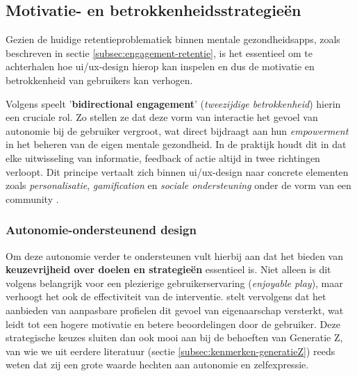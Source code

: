 \subsection{Motivatie- en betrokkenheidsstrategieën}
\label{subsec:motivatie-betrokkenheid-strat}

\vspace{1em}

Gezien de huidige retentieproblematiek binnen mentale gezondheidsapps, zoals beschreven in sectie \ref{subsec:engagement-retentie}, is het essentieel om te achterhalen hoe \acrshort{ui}/\acrshort{ux}-design hierop kan inspelen en dus de motivatie en betrokkenheid van gebruikers kan verhogen.

\vspace{1em}

Volgens \textcite{Portz2024} speelt '\textbf{bidirectional engagement}' (\textit{tweezijdige betrokkenheid}) hierin een cruciale rol. Zo stellen ze dat deze vorm van interactie het gevoel van autonomie bij de gebruiker vergroot, wat direct bijdraagt aan hun \textit{empowerment} in het beheren van de eigen mentale gezondheid. In de praktijk houdt dit in dat elke uitwisseling van informatie, feedback of actie altijd in twee richtingen verloopt. Dit principe vertaalt zich binnen \acrshort{ui}/\acrshort{ux}-design naar concrete elementen zoals \textit{personalisatie}, \textit{gamification} en \textit{sociale ondersteuning} onder de vorm van een community \autocite{Portz2024}.

\vspace{1em}

\subsubsection{Autonomie-ondersteunend design}
\label{subsubsec:autonomie-ondersteunend-design}

\vspace{1em}

Om deze autonomie verder te ondersteunen vult \textcite{Peters2022} hierbij aan dat het bieden van \textbf{keuzevrijheid over doelen en strategieën} essentieel is. Niet alleen is dit volgens \textcite{Peters2022} belangrijk voor een plezierige gebruikerservaring (\textit{enjoyable play}), maar verhoogt het ook de effectiviteit van de interventie. \textcite{Peters2022} stelt vervolgens dat het aanbieden van aanpasbare profielen dit gevoel van eigenaarschap versterkt, wat leidt tot een hogere motivatie en betere beoordelingen door de gebruiker. Deze strategische keuzes sluiten dan ook mooi aan bij de behoeften van Generatie Z, van wie we uit eerdere literatuur (sectie \ref{subsec:kenmerken-generatieZ}) reeds weten dat zij een grote waarde hechten aan autonomie en zelfexpressie.

